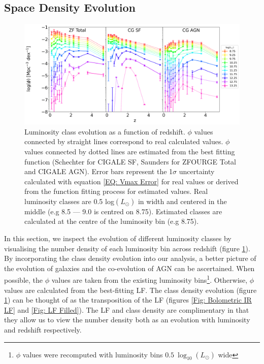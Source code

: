 \subsection{Space Density Evolution}
\label{Sec: Class Density}

\begin{figure}
    \centering
    \includegraphics[width=\textwidth]{Figures/Class Evo.png}
    \caption{Luminosity class evolution as a function of redshift. $\phi$ values connected by straight lines correspond to real calculated values. $\phi$ values connected by dotted lines are estimated from the best fitting function (Schechter for CIGALE SF, Saunders for ZFOURGE Total and CIGALE AGN). Error bars represent the 1$\sigma$ uncertainty calculated with equation \ref{EQ: Vmax Error} for real values or derived from the function fitting process for estimated values. Real luminosity classes are 0.5 log$(L_{\odot})$ in width and centered in the middle (e.g 8.5 --- 9.0 is centred on 8.75). Estimated classes are calculated at the centre of the luminosity bin (e.g 8.75).}
    \label{Fig: Class Evo}
\end{figure}

In this section, we inspect the evolution of different luminosity classes by visualising the number density of each luminosity bin across redshift (figure \ref{Fig: Class Evo}). By incorporating the class density evolution into our analysis, a better picture of the evolution of galaxies and the co-evolution of AGN can be ascertained. When possible, the $\phi$ values are taken from the existing luminosity bins\footnote{$\phi$ values were recomputed with luminosity bins $0.5\ \log_{10}(L_{\odot})$ wide}. Otherwise, $\phi$ values are calculated from the best-fitting LF. The class density evolution (figure \ref{Fig: Class Evo}) can be thought of as the transposition of the LF (figures \ref{Fig: Bolometric IR LF} and \ref{Fig: LF Filled}). The LF and class density are complimentary in that they allow us to view the number density both as an evolution with luminosity and redshift respectively. 


